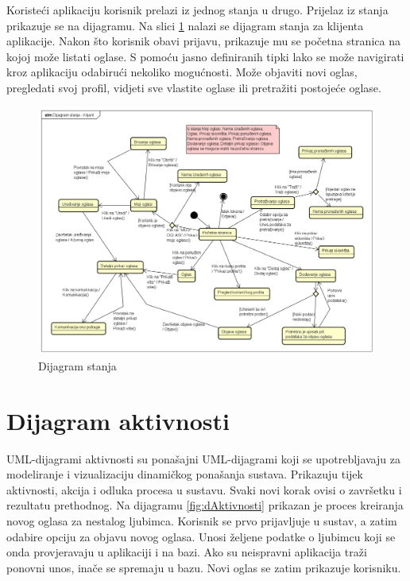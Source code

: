 			
			Koristeći aplikaciju korisnik prelazi iz jednog stanja u drugo. Prijelaz iz stanja prikazuje se na dijagramu. Na slici \ref{fig:dStanja} nalazi se dijagram stanja za klijenta aplikacije. Nakon što korisnik obavi prijavu, prikazuje mu se početna stranica na kojoj može listati oglase. S pomoću jasno definiranih tipki lako se može navigirati kroz aplikaciju odabirući nekoliko mogućnosti. Može objaviti novi oglas, pregledati svoj profil, vidjeti sve vlastite oglase ili pretražiti postojeće oglase.
			
			\begin{figure}[H]
				\includegraphics[scale=0.4]{dijagrami/dijagramStanja/dijagramStanja.PNG} %
				\centering
				\caption{Dijagram stanja}
				\label{fig:dStanja}
			\end{figure}
			
			\eject 
		
		\section{Dijagram aktivnosti}

			UML-dijagrami aktivnosti su ponašajni UML-dijagrami koji se upotrebljavaju za modeliranje i vizualizaciju dinamičkog ponašanja sustava. Prikazuju tijek aktivnosti, akcija i odluka procesa u sustavu. Svaki novi korak ovisi o završetku i rezultatu prethodnog. Na dijagramu \ref{fig:dAktivnosti} prikazan je proces kreiranja novog oglasa za nestalog ljubimca. Korisnik se prvo prijavljuje u sustav, a zatim odabire opciju za objavu novog oglasa. Unosi željene podatke o ljubimcu koji se onda provjeravaju u aplikaciji i na bazi. Ako su neispravni aplikacija traži ponovni unos, inače se spremaju u bazu. Novi oglas se zatim prikazuje korisniku.
			
